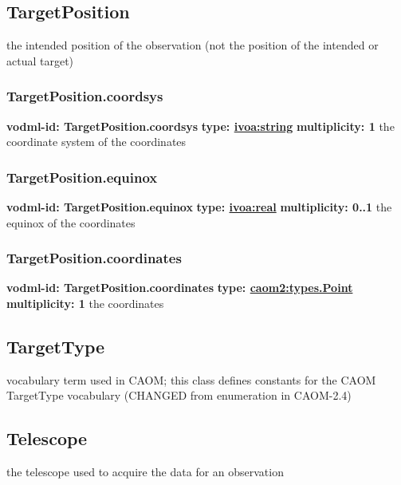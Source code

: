  \subsection{TargetPosition}
  \label{sect:TargetPosition}
    the intended position of the observation (not the position of the intended or actual target)

    \subsubsection{TargetPosition.coordsys}
      \textbf{vodml-id: TargetPosition.coordsys} \newline
      \textbf{type: \hyperref[sect:ivoa]{ivoa:string}} \newline
      \textbf{multiplicity: 1} \newline
      the coordinate system of the coordinates

    \subsubsection{TargetPosition.equinox}
      \textbf{vodml-id: TargetPosition.equinox} \newline
      \textbf{type: \hyperref[sect:ivoa]{ivoa:real}} \newline
      \textbf{multiplicity: 0..1} \newline
      the equinox of the coordinates

    \subsubsection{TargetPosition.coordinates}
      \textbf{vodml-id: TargetPosition.coordinates} \newline
      \textbf{type: \hyperref[sect:types.Point]{caom2:types.Point}} \newline
      \textbf{multiplicity: 1} \newline
      the coordinates

  \subsection{TargetType}
  \label{sect:TargetType}
    vocabulary term used in CAOM; this class defines constants for the CAOM TargetType vocabulary (CHANGED from enumeration in CAOM-2.4)

  \subsection{Telescope}
  \label{sect:Telescope}
    the telescope used to acquire the data for an observation

